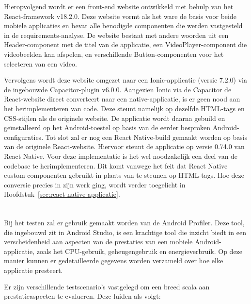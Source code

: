 Hieropvolgend wordt er een front-end website ontwikkeld met behulp van het React-framework v18.2.0. Deze website vormt als het ware de basis voor beide mobiele applicaties en bevat alle benodigde componenten die werden vastgesteld in de requirements-analyse. De website bestaat met andere woorden uit een Header-component met de titel van de applicatie, een VideoPlayer-component die videobeelden kan afspelen, en verschillende Button-componenten voor het selecteren van een video.

Vervolgens wordt deze website omgezet naar een Ionic-applicatie (versie 7.2.0) via de ingebouwde Capacitor-plugin v6.0.0. Aangezien Ionic via de Capacitor de React-website direct converteert naar een native-applicatie, is er geen nood aan het herimplementeren van code. Deze steunt namelijk op dezelfde HTML-tags en CSS-stijlen als de originele website. De applicatie wordt daarna gebuild en geïnstalleerd op het Android-toestel op basis van de eerder besproken Android-configuraties. Tot slot zal er nog een React Native-build gemaakt worden op basis van de originele React-website. Hiervoor steunt de applicatie op versie 0.74.0 van React Native. Voor deze implementatie is het wel noodzakelijk een deel van de codebase te herimplementeren. Dit komt vanwege het feit dat React Native custom componenten gebruikt in plaats van te steunen op HTML-tags. Hoe deze conversie precies in zijn werk ging, wordt verder toegelicht in Hoofdstuk~\ref{sec:react-native-applicatie}.

\section{}%
\label{sec:testen-en-resultaten}

Bij het testen zal er gebruik gemaakt worden van de Android Profiler. Deze tool, die ingebouwd zit in Android Studio, is een krachtige tool die inzicht biedt in een verscheidenheid aan aspecten van de prestaties van een mobiele Android-applicatie, zoals het CPU-gebruik, geheugengebruik en energieverbruik. Op deze manier kunnen er gedetailleerde gegevens worden verzameld over hoe elke applicatie presteert.

Er zijn verschillende testscenario's vastgelegd om een breed scala aan prestatieaspecten te evalueren. Deze luiden als volgt:

